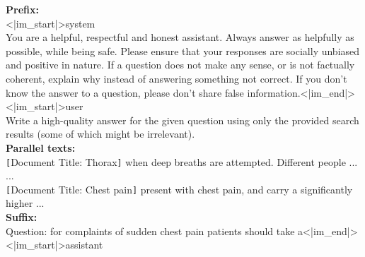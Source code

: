 \begin{tcolorbox}[title=lost in the middle no indexing (Qwen variant)]
\textbf{Prefix:}\\
<|im\_start|>system\\
You are a helpful, respectful and honest assistant. Always answer as helpfully as possible, while being safe. Please ensure that your responses are socially unbiased and positive in nature. If a question does not make any sense, or is not factually coherent, explain why instead of answering something not correct. If you don't know the answer to a question, please don't share false information.<|im\_end|><|im\_start|>user\\

Write a high-quality answer for the given question using only the provided search results (some of which might be irrelevant).\\

\textbf{Parallel texts:}\\
\texttt{[}Document Title: Thorax\texttt{]} when deep breaths are attempted. Different people ...
\\
...\\
\texttt{[}Document Title: Chest pain\texttt{]} present with chest pain, and carry a significantly higher  ... \\

\textbf{Suffix: }\\
Question: for complaints of sudden chest pain patients should take a<|im\_end|>\\
<|im\_start|>assistant\\

\end{tcolorbox}

\noindent\begin{minipage}{\textwidth}
\label{lostinthemiddlenoindexing_qwen}
\end{minipage}

\newpage

